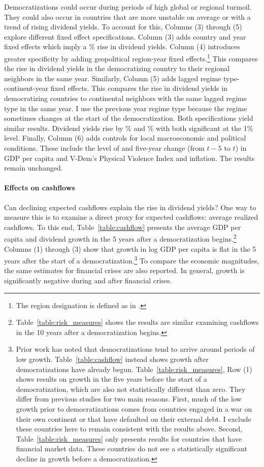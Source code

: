 \documentclass[12pt]{article}
\numberwithin{equation}{section}
\begin{document}
Democratizations could occur during periods of high global or regional turmoil. They could also occur in countries that are more unstable on average or with a trend of rising dividend yields. To account for this, Columns (3) through (5) explore different fixed effect specifications.  Column (3) adds country and year fixed effects which imply a \tabOnecolThreePE\% rise in dividend yields. Column (4) introduces greater specificity by adding geopolitical region-year fixed effects.\footnote{The region designation is defined as in \cite{Teorell2018}.} This compares the rise in dividend yields in the democratizing country to their regional neighbors in the same year. Similarly, Column (5) adds lagged regime type-continent-year fixed effects. This compares the rise in dividend yields in democratizing countries to continental neighbors with the same lagged regime type in the same year.  I use the previous year regime type because the regime sometimes changes at the start of the democratization. Both specifications yield similar results. Dividend yields rise by \tabOnecolFourPE\% and \tabOnecolFivePE\% with both significant at the 1\% level. Finally, Column (6) adds controls for local macroeconomic and political conditions. These include the level of and five-year change (from $t-5$ to $t$) in GDP per capita and V-Dem's Physical Violence Index and inflation. The results remain unchanged.

\paragraph{Effects on cashflows}
Can declining expected cashflows explain the rise in dividend yields? One way to measure this is to examine a direct proxy for expected cashflows: average realized cashflows. To this end, Table~\ref{table:cashflow} presents the average GDP per capita and dividend growth in the 5 years after a democratization begins.\footnote{Table~\ref{table:risk_measures} shows the results are similar examining cashflows in the 10 years after a democratization begins. } Columns (1) through (3) show that growth in log GDP per capita is flat in the 5 years after the start of a democratization.\footnote{Prior work has noted that democratizations tend to arrive around periods of low growth.  Table~\ref{table:cashflow} instead shows growth after democratizations have already begun. Table~\ref{table:risk_measures}, Row (1) shows results on growth in the five years before the start of a democratization, which are also not statistically different than zero. They differ from previous studies for two main reasons. First, much of the low growth prior to democratizations comes from countries engaged in a war on their own continent or that have defaulted on their external debt. I exclude these countries here to remain consistent with the results above. Second, Table~\ref{table:risk_measures} only presents results for countries that have financial market data. These countries do not see a statistically significant decline in growth before a democratization.} To compare the economic magnitudes, the same estimates for financial crises are also reported. In general, growth is significantly negative during and after financial crises.
\end{document}
